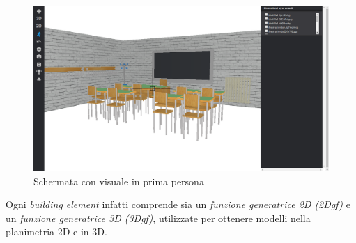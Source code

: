 \begin{figure}[htbp] %
   \centering
   \includegraphics[width=1\linewidth]{images/1d-school}
   \caption{Schermata con visuale in prima persona}
   \label{fig:1D-school}
\end{figure}

Ogni \emph{building element} infatti comprende sia un \emph{funzione generatrice 2D (2Dgf)} e un
\emph{funzione generatrice 3D (3Dgf)}, utilizzate per ottenere modelli nella planimetria 2D e in 3D.
\newpage
